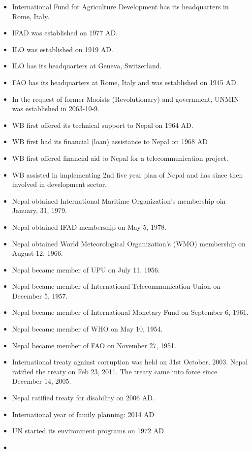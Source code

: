 \documentclass[
]{book}
\begin{document}
\begin{itemize}
\item
  International Fund for Agriculture Development has its headquarters in Rome, Italy.
\item
  IFAD was established on 1977 AD.
\item
  ILO was established on 1919 AD.
\item
  ILO has its headquarters at Geneva, Switzerland.
\item
  FAO has its headquarters at Rome, Italy and was established on 1945 AD.
\item
  In the request of former Maoists (Revolutionary) and government, UNMIN was established in 2063-10-9.
\item
  WB first offered its technical support to Nepal on 1964 AD.
\item
  WB first had its financial (loan) assistance to Nepal on 1968 AD
\item
  WB first offered financial aid to Nepal for a telecommunication project.
\item
  WB assisted in implementing 2nd five year plan of Nepal and has since then involved in development sector.
\item
  Nepal obtained International Maritime Organization's membership oin January, 31, 1979.
\item
  Nepal obtained IFAD membership on May 5, 1978.
\item
  Nepal obtained World Meteorological Organization's (WMO) membership on August 12, 1966.
\item
  Nepal became member of UPU on July 11, 1956.
\item
  Nepal became member of International Telecommunication Union on December 5, 1957.
\item
  Nepal became member of International Monetary Fund on September 6, 1961.
\item
  Nepal became member of WHO on May 10, 1954.
\item
  Nepal became member of FAO on November 27, 1951.
\item
  International treaty against corruption was held on 31st October, 2003. Nepal ratified the treaty on Feb 23, 2011. The treaty came into force since December 14, 2005.
\item
  Nepal ratified treaty for disability on 2006 AD.
\item
  International year of family planning: 2014 AD
\item
  UN started its environment programs on 1972 AD
\item

\end{itemize}
\end{document}
